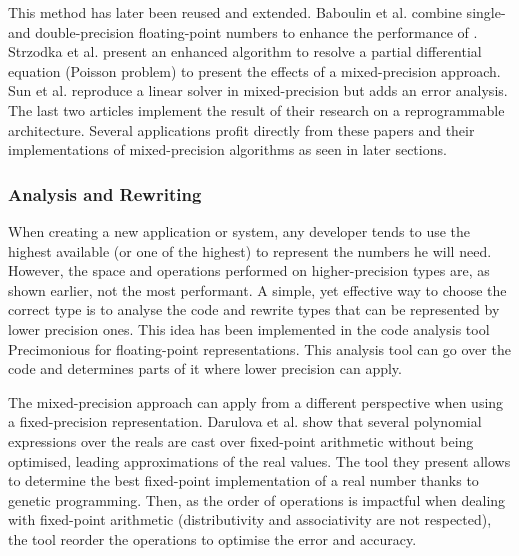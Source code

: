 This method has later been reused and extended. Baboulin et al. \cite{Baboulin2009} combine single- and double-precision floating-point numbers to enhance the performance of . Strzodka et al. \cite{Strzodka2006} present an enhanced algorithm to resolve a partial differential equation (Poisson problem) to present the effects of a mixed-precision approach. Sun et al. \cite{Sun2008} reproduce a linear solver in mixed-precision but adds an error analysis. The last two articles implement the result of their research on a reprogrammable architecture. Several applications profit directly from these papers and their implementations of mixed-precision algorithms as seen in later sections.


\subsubsection{Analysis and Rewriting}

When creating a new application or system, any developer tends to use the highest available (or one of the highest) to represent the numbers he will need. However, the space and operations performed on higher-precision types are, as shown earlier, not the most performant. A simple, yet effective way to choose the correct type is to analyse the code and rewrite types that can be represented by lower precision ones. This idea has been implemented in the code analysis tool Precimonious \cite{Rubio2013} for floating-point representations. This analysis tool can go over the code and determines parts of it where lower precision can apply.

The mixed-precision approach can apply from a different perspective when using a fixed-precision representation. Darulova et al. \cite{Darulova2013} show that several polynomial expressions over the reals are cast over fixed-point arithmetic without being optimised, leading approximations of the real values. The tool they present allows to determine the best fixed-point implementation of a real number thanks to genetic programming. Then, as the order of operations is impactful when dealing with fixed-point arithmetic (distributivity and associativity are not respected), the tool reorder the operations to optimise the error and accuracy.


